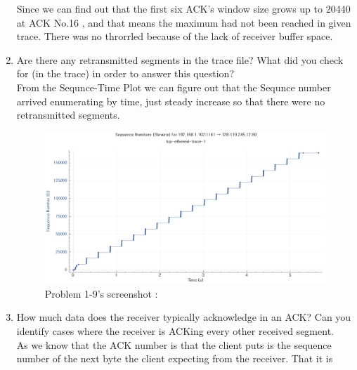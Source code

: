 \begin{enumerate}[label=\bfseries Problem \arabic*:,leftmargin=*,labelindent=1em]
        Since we can find out that the first six ACK’s window size grows up to 20440 at ACK No.16 , and that means the maximum had not been reached in given trace. There was no throrrled because of the lack of receiver buffer space.
        \item Are there any retransmitted segments in the trace file? What did you check for (in the trace) in order to answer this question?\\[0.2mm]
        \soln From the Sequnce-Time Plot we can figure out that the Sequnce number arrived enumerating by time, just steady increase so that there were no retransmitted segments.
        \begin{figure}[!h]\centering
        \hspace{15mm}  
    		\includegraphics[width=.75\textwidth]{image/week02/1-9-1.png}
    		\caption{\footnotesize Problem 1-9's screenshot : }
    		\vspace{-10pt}
        \end{figure}
\clearpage
        \item How much data does the receiver typically acknowledge in an ACK? Can you identify cases where the receiver is ACKing every other received segment.\\[0.2mm]
        \soln As we know that the ACK number is that the client puts is  the sequence number of the next byte the client expecting from the receiver. That it is 

\end{enumerate}

